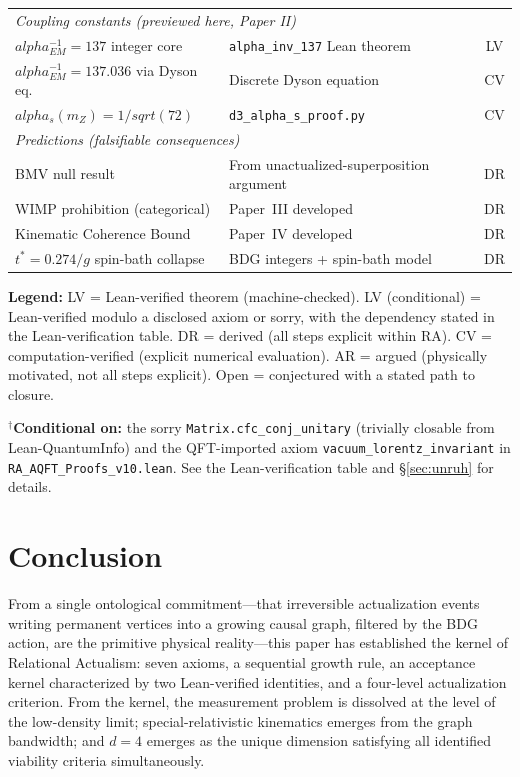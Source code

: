 \documentclass[11pt]{article}
\def\alpha{alpha}%
\def\mathrm#1{#1}%
\def\sqrt#1{sqrt(#1)}%
\begin{document}
\begin{center}
\begin{tabular}{llc}
\midrule
\multicolumn{3}{l}{\textit{Coupling constants (previewed here, Paper II)}} \\
$\alpha_{\mathrm{EM}}^{-1}=137$ integer core & \texttt{alpha\_inv\_137} Lean theorem & LV \\
$\alpha_{\mathrm{EM}}^{-1}=137.036$ via Dyson eq. & Discrete Dyson equation & CV \\
$\alpha_s(m_Z)=1/\sqrt{72}$ & \texttt{d3\_alpha\_s\_proof.py} & CV \\
\midrule
\multicolumn{3}{l}{\textit{Predictions (falsifiable consequences)}} \\
BMV null result & From unactualized-superposition argument & DR \\
WIMP prohibition (categorical) & Paper~III developed & DR \\
Kinematic Coherence Bound & Paper~IV developed & DR \\
$t^*=0.274/g$ spin-bath collapse & BDG integers + spin-bath model & DR \\
\bottomrule
\end{tabular}
\end{center}

\textbf{Legend:} LV = Lean-verified theorem (machine-checked). LV (conditional) = Lean-verified modulo a disclosed axiom or sorry, with the dependency stated in the Lean-verification table. DR = derived (all steps explicit within RA). CV = computation-verified (explicit numerical evaluation). AR = argued (physically motivated, not all steps explicit). Open = conjectured with a stated path to closure.

\noindent$^\dagger$\textbf{Conditional on:} the sorry \texttt{Matrix.cfc\_conj\_unitary} (trivially closable from Lean-QuantumInfo) and the QFT-imported axiom \texttt{vacuum\_lorentz\_invariant} in \texttt{RA\_AQFT\_Proofs\_v10.lean}. See the Lean-verification table and \S\ref{sec:unruh} for details.

\section{Conclusion}
\label{sec:conclusion}

From a single ontological commitment---that irreversible actualization events writing permanent vertices into a growing causal graph, filtered by the BDG action, are the primitive physical reality---this paper has established the kernel of Relational Actualism: seven axioms, a sequential growth rule, an acceptance kernel characterized by two Lean-verified identities, and a four-level actualization criterion. From the kernel, the measurement problem is dissolved at the level of the low-density limit; special-relativistic kinematics emerges from the graph bandwidth; and $d=4$ emerges as the unique dimension satisfying all identified viability criteria simultaneously.
\end{document}
